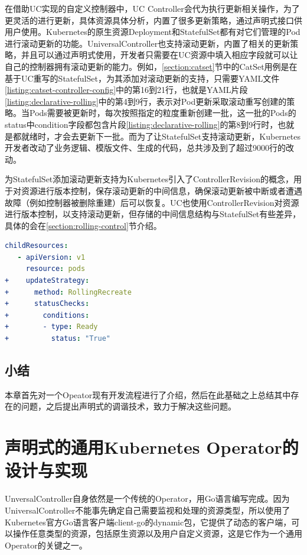 \documentclass[macfonts,master]{njuthesis}
\begin{document}
在借助UC实现的自定义控制器中，UC Controller会代为执行更新相关操作，为了更灵活的进行更新，具体资源具体分析，内置了很多更新策略，通过声明式接口供用户使用。Kubernetes的原生资源Deployment和StatefulSet都有对它们管理的Pod进行滚动更新的功能。UniversalController也支持滚动更新，内置了相关的更新策略，并且可以通过声明式使用，开发者只需要在UC资源中填入相应字段就可以让自己的控制器拥有滚动更新的能力。例如，\ref{section:catset}节中的CatSet用例是在基于UC重写的StatefulSet，为其添加对滚动更新的支持，只需要YAML文件\ref{listing:catset-controller-config}中的第16到21行，也就是YAML片段\ref{listing:declarative-rolling}中的第4到9行，表示对Pod更新采取滚动重写创建的策略。当Pods需要被更新时，每次按照指定的粒度重新创建一批，这一批的Pods的status中condition字段都包含片段\ref{listing:declarative-rolling}的第8到9行时，也就是都就绪时，才会去更新下一批。而为了让StatefulSet支持滚动更新，Kubernetes开发者改动了业务逻辑、模版文件、生成的代码，总共涉及到了超过9000行的改动\cite{statefulsetupdate}。

为StatefulSet添加滚动更新支持为Kubernetes引入了ControllerRevision的概念，用于对资源进行版本控制，保存滚动更新的中间信息，确保滚动更新被中断或者遭遇故障（例如控制器被删除重建）后可以恢复。UC也使用ControllerRevision对资源进行版本控制，以支持滚动更新，但存储的中间信息结构与StatefulSet有些差异，具体的会在\ref{section:rolling-control}节介绍。
\begin{lstlisting}[language=yaml,caption=添加滚动更新,label=listing:declarative-rolling]
   childResources:
   - apiVersion: v1
     resource: pods
+    updateStrategy:
+      method: RollingRecreate
+      statusChecks:
+        conditions:
+        - type: Ready
+          status: "True"
\end{lstlisting}

\section{小结}

本章首先对一个Opeator现有开发流程进行了介绍，然后在此基础之上总结其中存在的问题，之后提出声明式的调谐技术，致力于解决这些问题。

\chapter{声明式的通用Kubernetes Operator的设计与实现}\label{chapter_implement}
UnversalController自身依然是一个传统的Operator，用Go语言编写完成。因为UniversalController不能事先确定自己需要监视和处理的资源类型，所以使用了Kubernetes官方Go语言客户端client-go的dynamic包，它提供了动态的客户端，可以操作任意类型的资源，包括原生资源以及用户自定义资源，这是它作为一个通用Operator的关键之一。
\end{document}
